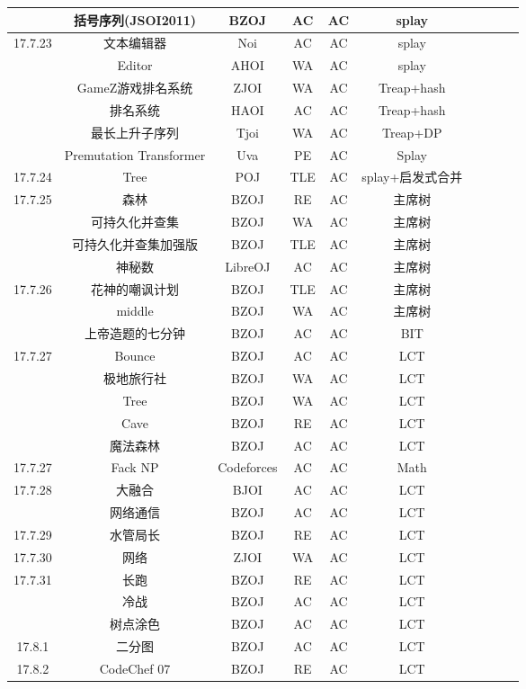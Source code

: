 \documentclass[landscape]{article}
\begin{document}
\begin{longtable}{cccccccccc}
  & 括号序列(JSOI2011) & BZOJ & AC & AC & splay\\
  \hline
  17.7.23 & 文本编辑器 & Noi & AC & AC & splay\\
  & Editor & AHOI & WA & AC & splay\\
  & GameZ游戏排名系统 & ZJOI & WA & AC & Treap+hash\\
  & 排名系统 & HAOI & AC & AC & Treap+hash\\
  & 最长上升子序列 & Tjoi & WA & AC & Treap+DP\\
  & Premutation Transformer & Uva & PE & AC & Splay\\
  \hline
  17.7.24 & Tree & POJ & TLE & AC &splay+启发式合并\\
  \hline
  17.7.25 & 森林 & BZOJ & RE & AC & 主席树\\
  & 可持久化并查集　& BZOJ & WA & AC & 主席树\\
  & 可持久化并查集加强版　& BZOJ & TLE & AC & 主席树\\
  & 神秘数　& LibreOJ & AC & AC & 主席树\\
  \hline
  17.7.26 & 花神的嘲讽计划 & BZOJ & TLE & AC & 主席树\\
  & middle & BZOJ & WA & AC & 主席树\\
  & 上帝造题的七分钟 & BZOJ & AC & AC & BIT\\
  \hline
  17.7.27 & Bounce & BZOJ & AC & AC & LCT\\
  & 极地旅行社 & BZOJ & WA & AC & LCT\\
  & Tree & BZOJ & WA & AC & LCT\\
  & Cave & BZOJ & RE & AC & LCT\\
  & 魔法森林 & BZOJ & AC & AC & LCT\\
  \hline
  17.7.27 & Fack NP &Codeforces & AC & AC & Math\\ 
  \hline
  17.7.28 & 大融合 & BJOI & AC & AC & LCT\\
  & 网络通信 & BZOJ & AC & AC & LCT\\
  \hline
  17.7.29 & 水管局长 & BZOJ & RE & AC & LCT\\
  \hline
  17.7.30 & 网络 & ZJOI & WA & AC & LCT\\
  \hline
  17.7.31 & 长跑 & BZOJ & RE& AC &LCT\\
  & 冷战 & BZOJ & AC & AC & LCT\\
  & 树点涂色 & BZOJ & AC & AC & LCT\\
  \hline
  17.8.1 & 二分图 & BZOJ & AC & AC & LCT\\
  \hline
  17.8.2 & CodeChef 07 & BZOJ & RE & AC & LCT\\

\end{longtable}
\end{document}
